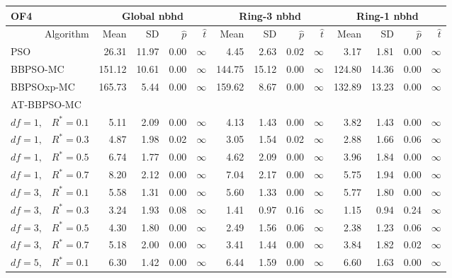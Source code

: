\documentclass[12pt]{article}
\begin{document}
\begin{table}[ht]
\centering
\tiny{
\begin{tabular}{r|rrrr|rrrr|rrrr}
\multicolumn{1}{l}{OF4} & \multicolumn{4}{c}{Global nbhd} & \multicolumn{4}{c}{Ring-3 nbhd} & \multicolumn{4}{c}{Ring-1 nbhd}\\
  \hline
Algorithm & Mean & SD & $\widehat{p}$ & $\widehat{t}$ & Mean & SD & $\widehat{p}$ & $\widehat{t}$ & Mean & SD & $\widehat{p}$ & $\widehat{t}$ \\ 
  \hline
\multicolumn{1}{l|}{PSO} & 26.31 & 11.97 & 0.00 & $\infty$ & 4.45 & 2.63 & 0.02 & $\infty$ & 3.17 & 1.81 & 0.00 & $\infty$ \\ 
  \multicolumn{1}{l|}{BBPSO-MC} & 151.12 & 10.61 & 0.00 & $\infty$ & 144.75 & 15.12 & 0.00 & $\infty$ & 124.80 & 14.36 & 0.00 & $\infty$ \\ 
  \multicolumn{1}{l|}{BBPSOxp-MC} & 165.73 & 5.44 & 0.00 & $\infty$ & 159.62 & 8.67 & 0.00 & $\infty$ & 132.89 & 13.23 & 0.00 & $\infty$ \\ 
\hline
\multicolumn{1}{l|}{AT-BBPSO-MC} &&&&&&&&&&&&\\
  $df = 1,\enspace$ $R^* =0.1$ & 5.11 & 2.09 & 0.00 & $\infty$ & 4.13 & 1.43 & 0.00 & $\infty$ & 3.82 & 1.43 & 0.00 & $\infty$ \\ 
  $df = 1,\enspace$ $R^* =0.3$ & 4.87 & 1.98 & 0.02 & $\infty$ & 3.05 & 1.54 & 0.02 & $\infty$ & 2.88 & 1.66 & 0.06 & $\infty$ \\ 
  $df = 1,\enspace$ $R^* =0.5$ & 6.74 & 1.77 & 0.00 & $\infty$ & 4.62 & 2.09 & 0.00 & $\infty$ & 3.96 & 1.84 & 0.00 & $\infty$ \\ 
  $df = 1,\enspace$ $R^* =0.7$ & 8.20 & 2.12 & 0.00 & $\infty$ & 7.04 & 2.17 & 0.00 & $\infty$ & 5.75 & 1.94 & 0.00 & $\infty$ \\ 
  $df = 3,\enspace$ $R^* =0.1$ & 5.58 & 1.31 & 0.00 & $\infty$ & 5.60 & 1.33 & 0.00 & $\infty$ & 5.77 & 1.80 & 0.00 & $\infty$ \\ 
  $df = 3,\enspace$ $R^* =0.3$ & 3.24 & 1.93 & 0.08 & $\infty$ & 1.41 & 0.97 & 0.16 & $\infty$ & 1.15 & 0.94 & 0.24 & $\infty$ \\ 
  $df = 3,\enspace$ $R^* =0.5$ & 4.30 & 1.80 & 0.00 & $\infty$ & 2.49 & 1.56 & 0.06 & $\infty$ & 2.38 & 1.23 & 0.06 & $\infty$ \\ 
  $df = 3,\enspace$ $R^* =0.7$ & 5.18 & 2.00 & 0.00 & $\infty$ & 3.41 & 1.44 & 0.00 & $\infty$ & 3.84 & 1.82 & 0.02 & $\infty$ \\ 
  $df = 5,\enspace$ $R^* =0.1$ & 6.30 & 1.42 & 0.00 & $\infty$ & 6.44 & 1.59 & 0.00 & $\infty$ & 6.60 & 1.63 & 0.00 & $\infty$ \\ 

\end{tabular}}
\end{table}
\end{document}
